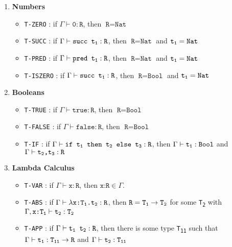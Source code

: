 \documentclass[fleqn, 11pt]{article}
\begin{document}
\begin{enumerate}
    \item \textbf{Numbers}
    \begin{itemize}
        \item \texttt{T-ZERO} : if $\Gamma \vdash \texttt{0} : \texttt{R}$, then $\texttt{R} = \texttt{Nat}$
        \item \texttt{T-SUCC} : if $\Gamma \vdash \texttt{succ t\textsubscript{1}} : \texttt{R}$, 
        then $\texttt{R} = \texttt{Nat}$ and $\texttt{t\textsubscript{1}} = \texttt{Nat}$
        \item \texttt{T-PRED} : if $\Gamma \vdash \texttt{pred t\textsubscript{1}} : \texttt{R}$, 
        then $\texttt{R} = \texttt{Nat}$ and $\texttt{t\textsubscript{1}} = \texttt{Nat}$
        \item \texttt{T-ISZERO} : if $\Gamma \vdash \texttt{succ t\textsubscript{1}} : \texttt{R}$, 
        then $\texttt{R} = \texttt{Bool}$ and $\texttt{t\textsubscript{1}} = \texttt{Nat}$
    \end{itemize}

    \item \textbf{Booleans}
    \begin{itemize}
        \item \texttt{T-TRUE} : if $\Gamma \vdash \texttt{true} : \texttt{R}$, then $\texttt{R} = \texttt{Bool}$
        \item \texttt{T-FALSE} : if $\Gamma \vdash \texttt{false} : \texttt{R}$, then $\texttt{R} = \texttt{Bool}$
        \item \texttt{T-IF} : if $\Gamma \vdash \texttt{if t\textsubscript{1} then t\textsubscript{2} else t\textsubscript{3}} 
        : \texttt{R}$, then $\Gamma \vdash \texttt{t\textsubscript{1}} : \texttt{Bool}$ and 
        $\Gamma \vdash \texttt{t\textsubscript{2},t\textsubscript{3}}  : \texttt{R}$
    \end{itemize}

    \item \textbf{Lambda Calculus}
    \begin{itemize}
        \item \texttt{T-VAR} : if $\Gamma \vdash \texttt{x} : \texttt{R}$, then $\texttt{x:R} \in \Gamma$.
        \item \texttt{T-ABS} : if $\Gamma \vdash \lambda \texttt{x:T\textsubscript{1}.t\textsubscript{2}} : \texttt{R}$, 
        then $\texttt{R} = \texttt{T\textsubscript{1}} \rightarrow \texttt{T\textsubscript{2}}$ for some \texttt{T\textsubscript{2}} 
        with $\Gamma, \texttt{x:T\textsubscript{1}} \vdash \texttt{t\textsubscript{2}} : \texttt{T\textsubscript{2}}$
        \item \texttt{T-APP} : if $\Gamma \vdash \texttt{t\textsubscript{1} t\textsubscript{2}} : \texttt{R}$, then there 
        is some type \texttt{T\textsubscript{11}} such that 
        $\Gamma \vdash \texttt{t\textsubscript{1}} : \texttt{T\textsubscript{11}} \rightarrow \texttt{R}$ and 
        $\Gamma \vdash \texttt{t\textsubscript{2}} : \texttt{T\textsubscript{11}}$
    \end{itemize}


\end{enumerate}
\end{document}
